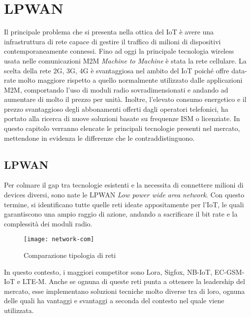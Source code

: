 \chapter{LPWAN}
Il principale problema che si presenta nella ottica del IoT è avere una
infrastruttura di rete capace di gestire il traffico di milioni di dispositivi
contemporaneamente connessi. Fino ad oggi la principale tecnologia wireless
usata nelle comunicazioni M2M \emph{Machine to Machine} è stata la rete
cellulare.   La scelta della rete 2G, 3G, 4G è svantaggiosa nel ambito del IoT
poiché offre data-rate molto maggiore rispetto a quello normalmente utilizzato
dalle applicazioni M2M, comportando l'uso di moduli radio sovradimensionati e
andando ad aumentare di molto il prezzo per unità.  Inoltre, l'elevato consumo
energetico e il prezzo svantaggioso degli abbonamenti offerti dagli operatori
telefonici, ha portato alla ricerca di nuove soluzioni basate su frequenze ISM o
licenziate.  In questo capitolo verranno elencate le principali tecnologie
presenti nel mercato, mettendone in evidenza le differenze che le
contraddistinguono.

\section{LPWAN}
Per colmare il gap tra tecnologie esistenti e la necessita di connettere milioni
di devices diversi, sono nate le  LPWAN \emph{Low power wide area network}.
Con questo termine, si identificano tutte quelle reti ideate appositamente per
l'IoT, le quali garantiscono una ampio raggio di azione, andando a sacrificare
il bit rate e la complessità dei moduli radio.

\begin{figure}[h]
    \centering 
        \texttt{[image: network-com]}
    \caption{Comparazione tipologia di reti}
\end{figure}

In questo contesto, i maggiori competitor sono Lora, Sigfox, NB-IoT, EC-GSM-IoT
e LTE-M.  Anche se ognuna di queste reti punta a ottenere la leadership del
mercato, esse implementano soluzioni tecniche molto diverse tra di loro, ognuna
delle quali ha vantaggi e svantaggi a seconda del contesto nel quale viene
utilizzata.


